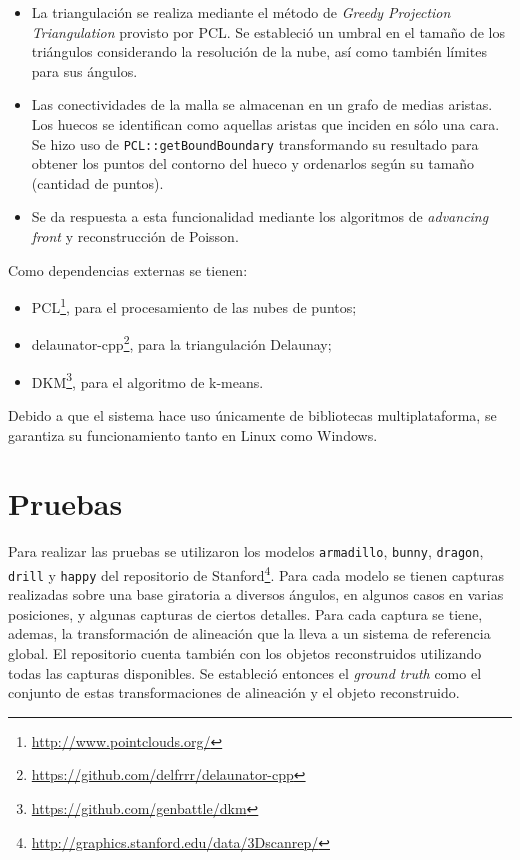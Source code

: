 \begin{itemize}
			\item  {}
				La triangulación se realiza mediante el método de \emph{Greedy
				Projection Triangulation} provisto por PCL.
				Se estableció un umbral en el tamaño de los triángulos considerando la resolución de la nube,
				así como también límites para sus ángulos.

			\item  {}
				Las conectividades de la malla se almacenan en un grafo de medias aristas.
				Los huecos se identifican como aquellas aristas que inciden en sólo una cara.
				Se hizo uso de \texttt{PCL::getBoundBoundary} transformando su resultado para
				obtener los puntos del contorno del hueco y ordenarlos según su tamaño
				(cantidad de puntos).

			\item  {}
				Se da respuesta a esta funcionalidad mediante los algoritmos de \emph{advancing front} y reconstrucción de Poisson.
		\end{itemize}


		Como dependencias externas se tienen:
		\begin{itemize}
			\item PCL\footnote{\url{http://www.pointclouds.org/}},
				para el procesamiento de las nubes de puntos;
			\item delaunator-cpp\footnote{\url{https://github.com/delfrrr/delaunator-cpp}}, para la triangulación Delaunay;
			\item DKM\footnote{\url{https://github.com/genbattle/dkm}}, para el algoritmo de k-means.
		\end{itemize}
		Debido a que el sistema hace uso únicamente de bibliotecas multiplataforma,
		se garantiza su funcionamiento tanto en Linux como Windows.

	\section{Pruebas}
		Para realizar las pruebas se utilizaron los modelos
			\texttt{armadillo},
			\texttt{bunny},
			\texttt{dragon},
			\texttt{drill} y
			\texttt{happy} del repositorio de Stanford\footnote{\url{http://graphics.stanford.edu/data/3Dscanrep/}}.
		Para cada modelo se tienen capturas realizadas sobre una base giratoria
		a diversos ángulos, en algunos casos en varias posiciones, y
		algunas capturas de ciertos detalles.
		Para cada captura se tiene, ademas, la transformación de alineación que
		la lleva a un sistema de referencia global.
		El repositorio cuenta también con los objetos reconstruidos utilizando
		todas las capturas disponibles.
		Se estableció entonces el \emph{ground truth} como el conjunto de estas
		transformaciones de alineación y el objeto reconstruido.

